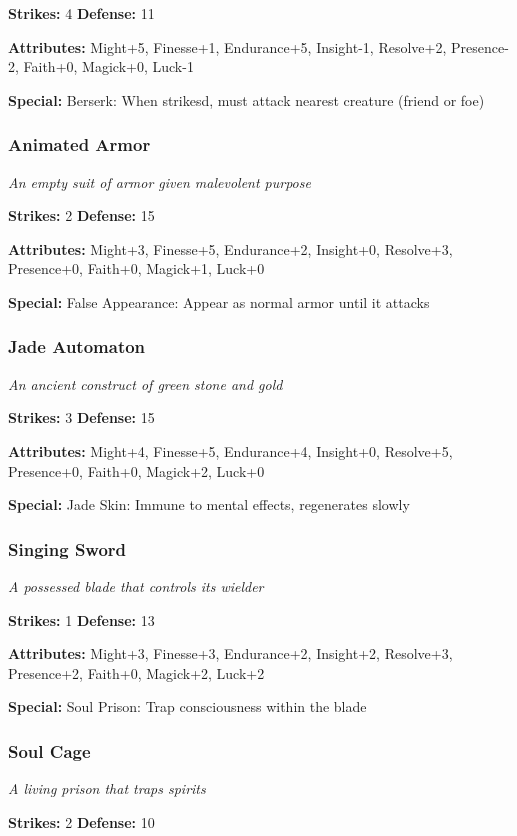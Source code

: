 \documentclass[10pt,twoside]{article}
\begin{document}
\textbf{Strikes:} 4 \quad \textbf{Defense:} 11

\textbf{Attributes:} Might+5, Finesse+1, Endurance+5, Insight-1, Resolve+2, Presence-2, Faith+0, Magick+0, Luck-1

\textbf{Special:} Berserk: When strikesd, must attack nearest creature (friend or foe)

\subsubsection{Animated Armor}
\textit{An empty suit of armor given malevolent purpose}

\textbf{Strikes:} 2 \quad \textbf{Defense:} 15

\textbf{Attributes:} Might+3, Finesse+5, Endurance+2, Insight+0, Resolve+3, Presence+0, Faith+0, Magick+1, Luck+0

\textbf{Special:} False Appearance: Appear as normal armor until it attacks

\subsubsection{Jade Automaton}
\textit{An ancient construct of green stone and gold}

\textbf{Strikes:} 3 \quad \textbf{Defense:} 15

\textbf{Attributes:} Might+4, Finesse+5, Endurance+4, Insight+0, Resolve+5, Presence+0, Faith+0, Magick+2, Luck+0

\textbf{Special:} Jade Skin: Immune to mental effects, regenerates slowly

\subsubsection{Singing Sword}
\textit{A possessed blade that controls its wielder}

\textbf{Strikes:} 1 \quad \textbf{Defense:} 13

\textbf{Attributes:} Might+3, Finesse+3, Endurance+2, Insight+2, Resolve+3, Presence+2, Faith+0, Magick+2, Luck+2

\textbf{Special:} Soul Prison: Trap consciousness within the blade

\subsubsection{Soul Cage}
\textit{A living prison that traps spirits}

\textbf{Strikes:} 2 \quad \textbf{Defense:} 10
\end{document}
